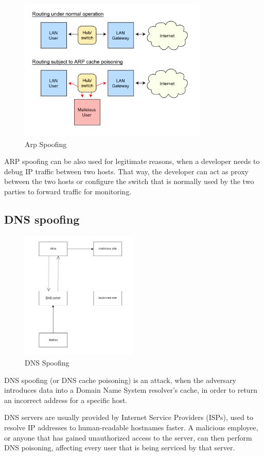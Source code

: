 \begin{figure}[H] \caption{Arp Spoofing} \centering
\includegraphics[width=0.8\textwidth]{diagrams/arp_spoofing.png}\end{figure}

ARP spoofing can be also used for legitimate reasons, when a developer needs to
debug IP traffic between two hosts. That way, the developer can act as proxy
between the two hosts or configure the switch that is normally used by the two
parties to forward traffic for monitoring.

\subsection{DNS spoofing}

\begin{figure}[H] \caption{DNS Spoofing} \centering
\includegraphics[width=0.5\textwidth]{diagrams/dns_spoofing.png}\end{figure}

DNS spoofing (or DNS cache poisoning) is an attack, when the adversary
introduces data into a Domain Name System resolver's cache, in order to return
an incorrect address for a specific host.

DNS servers are usually provided by Internet Service Providers (ISPs), used to
resolve IP addresses to human-readable hostnames faster. A malicious employee,
or anyone that has gained unauthorized access to the server, can then perform
DNS poisoning, affecting every user that is being serviced by that server.
